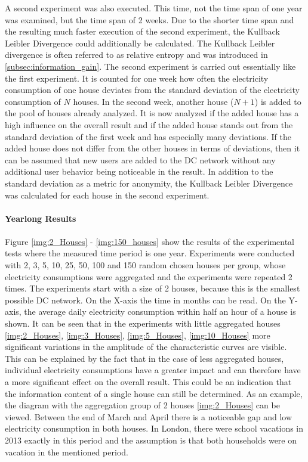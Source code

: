 A second experiment was also executed. This time, not the time span of one year was examined, but the time span of 2 weeks. Due to the shorter time span and the resulting much faster execution of the second experiment, the Kullback Leibler Divergence could additionally be calculated. 
The Kullback Leibler divergence is often referred to as relative entropy and was introduced in \ref{subsec:information_gain}.
The second experiment is carried out essentially like the first experiment. It is counted for one week how often the electricity consumption of one house deviates from the standard deviation of the electricity consumption of $N$ houses. In the second week, another house ($N+1$) is added to the pool of houses already analyzed. It is now analyzed if the added house has a high influence on the overall result and if the added house stands out from the standard deviation of the first week and has especially many deviations. If the added house does not differ from the other houses in terms of deviations, then it can be assumed that new users are added to the DC network without any additional user behavior being noticeable in the result. In addition to the standard deviation as a metric for anonymity, the Kullback Leibler Divergence was calculated for each house in the second experiment.
\\
\\
\textbf{Yearlong Results}
\\
\\
Figure \ref{img:2_Houses} - \ref{img:150_houses} show the results of the experimental tests where the measured time period is one year. Experiments were conducted with 2, 3, 5, 10, 25, 50, 100 and 150 random chosen houses per group, whose electricity consumptions were aggregated and the experiments were repeated 2 times. The experiments start with a size of 2 houses, because this is the smallest possible DC network. On the X-axis the time in months can be read. On the Y-axis, the average daily electricity consumption within half an hour of a house is shown. It can be seen that in the experiments with little aggregated houses \ref{img:2_Houses}, \ref{img:3_Houses}, \ref{img:5_Houses}, \ref{img:10_Houses} more significant variations in the amplitude of the characteristic curves are visible. This can be explained by the fact that in the case of less aggregated houses, individual electricity consumptions have a greater impact and can therefore have a more significant effect on the overall result. This could be an indication that the information content of a single house can still be determined. As an example, the diagram  with the aggregation group of 2 houses \ref{img:2_Houses} can be viewed. Between the end of March and April there is a noticeable gap and low electricity consumption in both houses. In London, there were school vacations in 2013 exactly in this period and the assumption is that both households were on vacation in the mentioned period.\\
